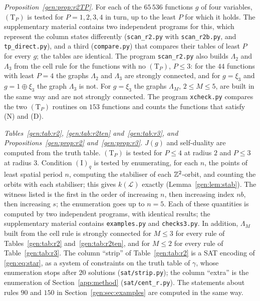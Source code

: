 \emph{Proposition~\ref{gen:prop:r2TP}.} For each of the $65\,536$ functions $g$ of four variables, $(\mathrm T_P)$ is tested for $P=1,2,3,4$ in turn, up to the least $P$ for which it holds. The supplementary material contains two independent programs for this, which represent the column states differently (\texttt{scan\_r2.py} with \texttt{scan\_r2b.py}, and \texttt{tp\_direct.py}), and a third (\texttt{compare.py}) that compares their tables of least $P$ for every $g$; the tables are identical. The program \texttt{scan\_r2.py} also builds $\Lambda_2$ and $\Lambda_3$ from the cell rule for the functions with no $(\mathrm T_P)$, $P\le3$: for the $44$ functions with least $P=4$ the graphs $\Lambda_2$ and $\Lambda_3$ are strongly connected, and for $g=\xi_3$ and $g=1\oplus\xi_3$ the graph $\Lambda_3$ is not. For $g=\xi_3$ the graphs $\Lambda_M$, $2\le M\le5$, are built in the same way and are not strongly connected. The program \texttt{xcheck.py} compares the two $(\mathrm T_P)$ routines on $153$ functions and counts the functions that satisfy \textup{(N)} and \textup{(D)}.

\emph{Tables~\ref{gen:tab:r2}, \ref{gen:tab:r2ten} and~\ref{gen:tab:r3}, and Propositions~\ref{gen:prop:r2} and~\ref{gen:prop:r3}.} $J(g)$ and self-duality are computed from the truth table. $(\mathrm T_P)$ is tested for $P\le4$ at radius $2$ and $P\le3$ at radius $3$. Condition $(\mathrm I)_q$ is tested by enumerating, for each $n$, the points of least spatial period $n$, computing the stabiliser of each $\mathbb{Z}^2$-orbit, and counting the orbits with each stabiliser; this gives $k(\mathcal L)$ exactly (Lemma~\ref{gen:lem:stab}). The witness listed is the first in the order of increasing $n$, then increasing index $nb$, then increasing $s$; the enumeration goes up to $n=5$. Each of these quantities is computed by two independent programs, with identical results; the supplementary material contains \texttt{examples.py} and \texttt{checks3.py}. In addition, $\Lambda_M$ built from the cell rule is strongly connected for $M\le3$ for every rule of Tables~\ref{gen:tab:r2} and~\ref{gen:tab:r2ten}, and for $M\le2$ for every rule of Table~\ref{gen:tab:r3}. The column ``strip'' of Table~\ref{gen:tab:r2} is a SAT encoding of \eqref{gen:eq:star}, as a system of constraints on the truth table of $\gamma$, whose enumeration stops after $20$ solutions (\texttt{sat/strip.py}); the column ``extra'' is the enumeration of Section~\ref{app:method} (\texttt{sat/cent\_r.py}). The statements about rules $90$ and $150$ in Section~\ref{gen:sec:examples} are computed in the same way.

